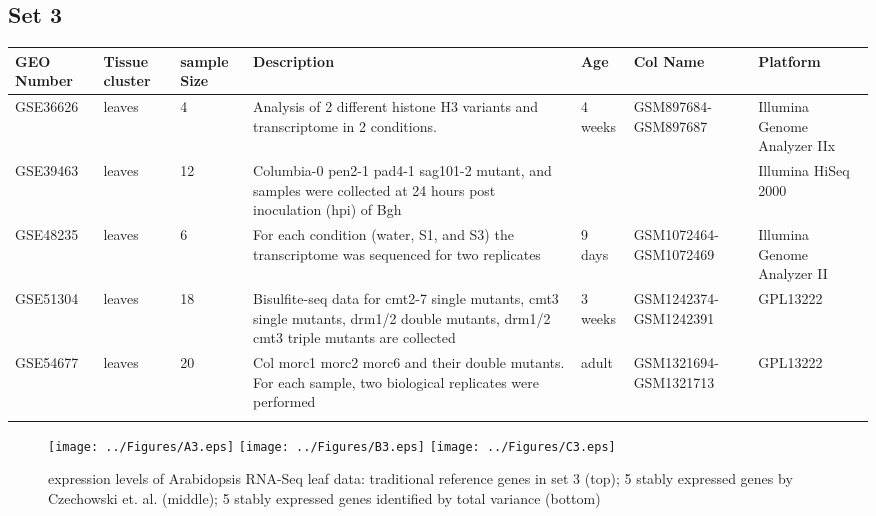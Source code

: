 \documentclass[11pt, a4paper]{article}
\begin{document}
\begin{landscape}
\subsection{Set 3}
\begin{table}
\footnotesize
\centering
\begin{tabular}{p{2cm}p{3cm}p{1cm}p{4cm}p{2.4cm}p{3cm}p{4cm}} \hline
GEO Number &Tissue cluster & sample Size & Description & Age  &Col Name & Platform\\ \hline
GSE36626 &leaves & 4 &Analysis of 2 different histone H3 variants and transcriptome in 2 conditions.  & 4 weeks &GSM897684-GSM897687 & Illumina Genome Analyzer IIx \\ \hdashline
GSE39463 &leaves  &12		&Columbia-0 pen2-1 pad4-1 sag101-2 mutant, and samples were collected at 24 hours post inoculation (hpi) of Bgh & & &Illumina HiSeq 2000 \\ \hdashline
GSE48235 &leaves & 6  & For each condition (water, S1, and S3) the transcriptome was sequenced for two replicates & 9 days & GSM1072464-GSM1072469  &Illumina Genome Analyzer II \\	\hdashline
GSE51304 &leaves  & 18 &Bisulfite-seq data for cmt2-7 single mutants, cmt3 single mutants, drm1/2 double mutants, drm1/2 cmt3 triple mutants are collected  & 3 weeks & GSM1242374-GSM1242391 &GPL13222 \\ \hdashline
GSE54677 & leaves   &20  &Col morc1 morc2 morc6 and their double mutants. For each sample, two biological replicates were performed &adult & GSM1321694-GSM1321713	 &	GPL13222\\ \hdashline
\end{tabular} 
\end{table}
\end{landscape}


 \begin{figure}[H]
\begin{center}
\texttt{[image: ../Figures/A3.eps]}
\texttt{[image: ../Figures/B3.eps]}
\texttt{[image: ../Figures/C3.eps]}
\caption{{\small{\label{sup:expressinlevel} expression levels of Arabidopsis RNA-Seq leaf data: traditional reference genes in set 3 (top)};  5 stably expressed genes by  Czechowski et. al. (middle); 5 stably expressed genes identified by total variance (bottom)}}
\end{center}
\end{figure} 


\end{document}
